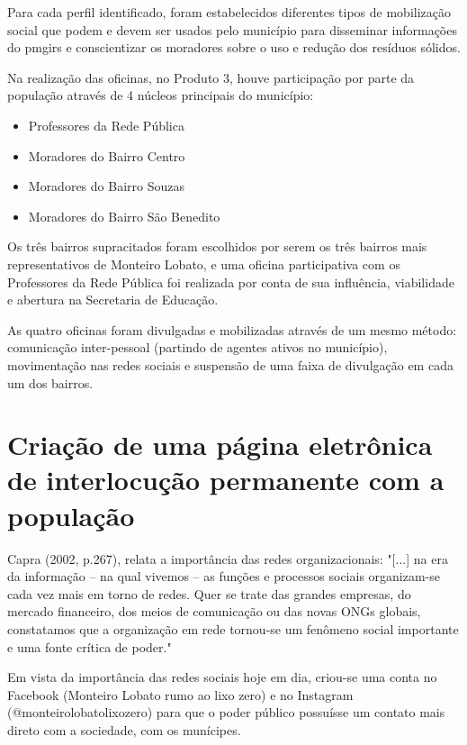 Para cada perfil identificado, foram estabelecidos diferentes tipos de mobilização social que podem e devem ser usados pelo município para disseminar informações do \gls{pmgirs} e conscientizar os moradores sobre o uso e redução dos resíduos sólidos.

Na realização das oficinas, no Produto 3, houve participação por parte da população através de 4 núcleos principais do município:

\begin{itemize}
	\item Professores da Rede Pública
	\item Moradores do Bairro Centro
	\item Moradores do Bairro Souzas
	\item Moradores do Bairro São Benedito
\end{itemize}

Os três bairros supracitados foram escolhidos por serem os três bairros mais representativos de Monteiro Lobato, e uma oficina participativa com os Professores da Rede Pública foi realizada por conta de sua influência, viabilidade e abertura na Secretaria de Educação.

As quatro oficinas foram divulgadas e mobilizadas através de um mesmo método: comunicação inter-pessoal (partindo de agentes ativos no município), movimentação nas redes sociais e suspensão de uma faixa de divulgação em cada um dos bairros.

\FloatBarrier
\newpage
\section{Criação de uma página eletrônica de interlocução permanente com a população}
\label{sec:pag_elet}

Capra (2002, p.267), relata a importância das redes organizacionais:
"[...] na era da informação – na qual vivemos – as funções e processos sociais organizam-se cada vez mais em torno de redes. Quer se trate das grandes
empresas, do mercado financeiro, dos meios de comunicação ou das novas ONGs globais, constatamos que a organização em rede tornou-se um fenômeno social importante e uma fonte crítica de poder."

Em vista da importância das redes sociais hoje em dia, criou-se uma conta no Facebook (Monteiro Lobato rumo ao lixo zero) e no Instagram (@monteirolobatolixozero) para que o poder público possuísse um contato mais direto com a sociedade, com os munícipes. 

